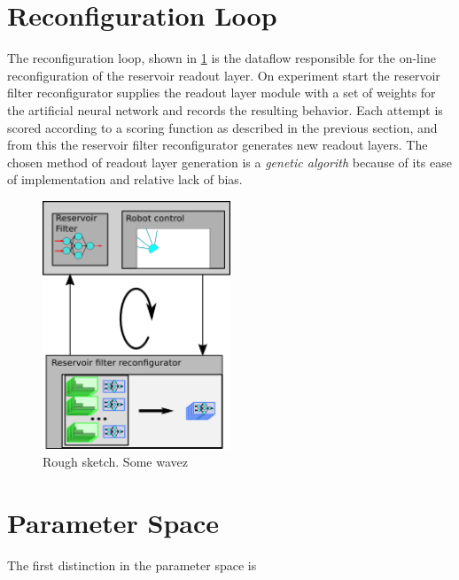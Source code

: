 \section{Reconfiguration Loop}
The reconfiguration loop, shown in \ref{figReconfLoop} is the dataflow
responsible for the on-line reconfiguration of the reservoir readout layer.
On experiment start the reservoir filter reconfigurator supplies the readout
layer module with a set of weights for the artificial neural network and records
the resulting behavior.
Each attempt is scored according to a scoring function as described in the
previous section, and from this the reservoir filter reconfigurator generates
new readout layers.
The chosen method of readout layer generation is a \emph{genetic algorith}
because of its ease of implementation and relative lack of bias.
\begin{figure}[h!]
  \centering
  \includegraphics[width=0.5\textwidth]{fig/reconfigLoop.png}
  \caption{Rough sketch.
    Some wavez
  }
  \label{figReconfLoop}
\end{figure}
\section{Parameter Space}
The first distinction in the parameter space is 


\cleardoublepage


